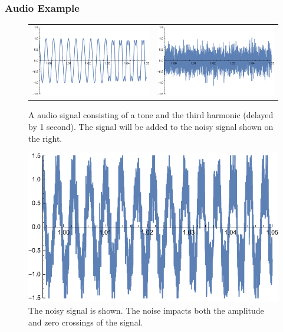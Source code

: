 \subsubsection{Audio Example}
\begin{figure}[tb]
\begin{center}
\begin{tabular}{cc}
\includegraphics[width=.45\columnwidth]{tonesintime.pdf} &
\includegraphics[width=.45\columnwidth]{noiseonly.pdf} \\
\end{tabular}
\end{center}
\caption{A audio signal consisting of a tone and the third harmonic (delayed by 1 second).  The signal will be added to the noisy signal shown on the right.}
\label{fig:tones_time}
\end{figure}
\begin{figure}[tb]
\begin{center}
\includegraphics[width=.45\columnwidth]{signoise.pdf}
\end{center}
\caption{The noisy signal is shown.  The noise impacts both the amplitude and zero crossings of the signal.} \label{fig:sigplusnoise}
\end{figure}
